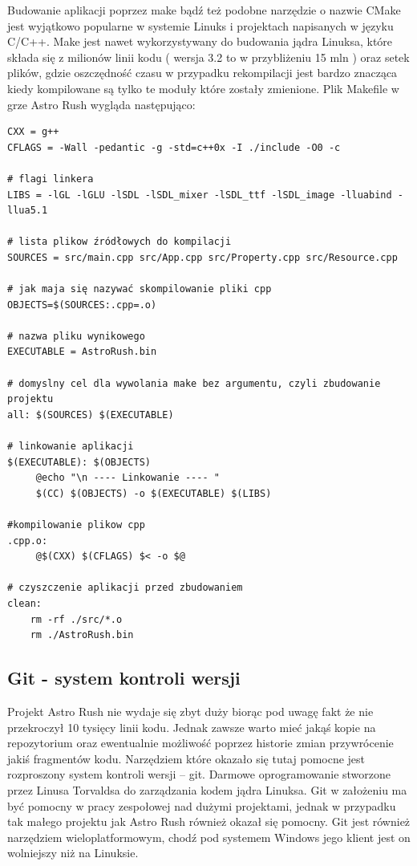 Budowanie aplikacji poprzez make bądź też podobne narzędzie o nazwie CMake jest wyjątkowo popularne w systemie Linuks i projektach napisanych w języku C/C++. Make jest nawet wykorzystywany do budowania jądra Linuksa, które składa się z milionów linii kodu ( wersja 3.2 to w przybliżeniu 15 mln ) oraz setek plików, gdzie oszczędność czasu w przypadku rekompilacji jest bardzo znacząca kiedy kompilowane są tylko te moduły które zostały zmienione. Plik Makefile w grze Astro Rush wygląda następująco:
\begingroup
\fontsize{10pt}{12pt}\selectfont
\begin{verbatim}  
CXX = g++
CFLAGS = -Wall -pedantic -g -std=c++0x -I ./include -O0 -c

# flagi linkera
LIBS = -lGL -lGLU -lSDL -lSDL_mixer -lSDL_ttf -lSDL_image -lluabind -llua5.1

# lista plikow źródłowych do kompilacji
SOURCES = src/main.cpp src/App.cpp src/Property.cpp src/Resource.cpp 

# jak maja się nazywać skompilowanie pliki cpp
OBJECTS=$(SOURCES:.cpp=.o)

# nazwa pliku wynikowego
EXECUTABLE = AstroRush.bin

# domyslny cel dla wywolania make bez argumentu, czyli zbudowanie projektu
all: $(SOURCES) $(EXECUTABLE)

# linkowanie aplikacji
$(EXECUTABLE): $(OBJECTS)
	 @echo "\n ---- Linkowanie ---- "
	 $(CC) $(OBJECTS) -o $(EXECUTABLE) $(LIBS)

#kompilowanie plikow cpp
.cpp.o:
	 @$(CXX) $(CFLAGS) $< -o $@

# czyszczenie aplikacji przed zbudowaniem  
clean:
	rm -rf ./src/*.o
	rm ./AstroRush.bin 

\end{verbatim}  
\endgroup


\subsection{Git - system kontroli wersji}

Projekt Astro Rush nie wydaje się zbyt duży biorąc pod uwagę fakt że nie przekroczył 10 tysięcy linii kodu. Jednak zawsze warto mieć jakąś kopie na repozytorium oraz ewentualnie możliwość poprzez historie  zmian przywrócenie jakiś fragmentów kodu. Narzędziem które okazało się tutaj pomocne jest rozproszony system kontroli wersji – git. Darmowe oprogramowanie stworzone przez Linusa Torvaldsa do zarządzania kodem jądra Linuksa. Git w założeniu ma być pomocny w pracy zespołowej nad dużymi projektami, jednak w przypadku tak małego projektu jak Astro Rush również okazał się pomocny. Git jest również narzędziem wieloplatformowym, chodź pod systemem Windows jego klient jest on wolniejszy niż na Linuksie.

